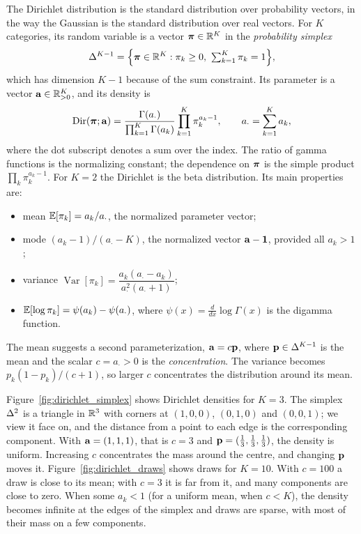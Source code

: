 The Dirichlet distribution is the standard distribution over probability vectors, in the way the Gaussian is the standard distribution over real vectors. For $K$ categories, its random variable is a vector $\boldsymbol{\pi}\in\mathbb{R}^K$ in the \emph{probability simplex}
\begin{equation}
  \simplex^{K-1} = \Big\{\vpi\in\R^K : \pi_k\geq 0,\ \textstyle\sum_{k=1}^K\pi_k=1\Big\},
\end{equation}
which has dimension $K-1$ because of the sum constraint. Its parameter is a vector $\mathbf{a}\in\mathbb{R}_{>0}^K$, and its density is
\begin{equation}
  \operatorname{Dir}(\boldsymbol{\pi};\mathbf{a}) = \frac{\Gamma(a_\cdot)}{\prod_{k=1}^K\Gamma(a_k)}\prod_{k=1}^K\pi_k^{a_k-1}, \qquad a_\cdot=\sum_{k=1}^K a_k ,
  \label{eq:dirichlet}
\end{equation}
where the dot subscript denotes a sum over the index. The ratio of gamma functions is the normalizing constant; the dependence on $\boldsymbol{\pi}$ is the simple product $\prod_k\pi_k^{a_k-1}$. For $K=2$ the Dirichlet is the beta distribution. Its main properties are:
\begin{itemize}
  \item mean $\mathbb{E}[\pi_k]=a_k/a_\cdot$, the normalized parameter vector;
  \item mode $(a_k-1)/(a_\cdot-K)$, the normalized vector $\mathbf{a}-\mathbf{1}$, provided all $a_k>1$;
  \item variance $\operatorname{Var}[\pi_k]=\dfrac{a_k(a_\cdot-a_k)}{a_\cdot^2(a_\cdot+1)}$;
  \item $\mathbb{E}[\log\pi_k]=\psi(a_k)-\psi(a_\cdot)$, where $\psi(x)=\frac{d}{dx}\log\Gamma(x)$ is the digamma function.
\end{itemize}
The mean suggests a second parameterization, $\mathbf{a}=c\mathbf{p}$, where $\mathbf{p}\in\Delta^{K-1}$ is the mean and the scalar $c=a_\cdot>0$ is the \emph{concentration}. The variance becomes $p_k(1-p_k)/(c+1)$, so larger $c$ concentrates the distribution around its mean.

Figure~\ref{fig:dirichlet_simplex} shows Dirichlet densities for $K=3$. The simplex $\Delta^2$ is a triangle in $\mathbb{R}^3$ with corners at $(1,0,0)$, $(0,1,0)$ and $(0,0,1)$; we view it face on, and the distance from a point to each edge is the corresponding component. With $\mathbf{a}=(1,1,1)$, that is $c=3$ and $\mathbf{p}=(\frac13,\frac13,\frac13)$, the density is uniform. Increasing $c$ concentrates the mass around the centre, and changing $\mathbf{p}$ moves it. Figure~\ref{fig:dirichlet_draws} shows draws for $K=10$. With $c=100$ a draw is close to its mean; with $c=3$ it is far from it, and many components are close to zero. When some $a_k<1$ (for a uniform mean, when $c<K$), the density becomes infinite at the edges of the simplex and draws are sparse, with most of their mass on a few components.

